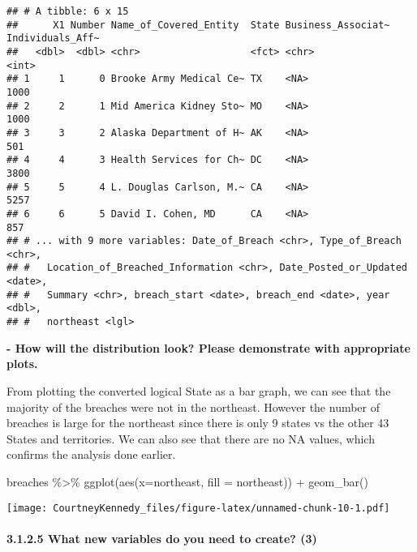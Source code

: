 \documentclass[
]{article}
\newenvironment{Shaded}{\begin{snugshade}}{\end{snugshade}}
\newcommand{\AttributeTok}[1]{\textcolor[rgb]{0.77,0.63,0.00}{#1}}
\newcommand{\FunctionTok}[1]{\textcolor[rgb]{0.00,0.00,0.00}{#1}}
\newcommand{\NormalTok}[1]{#1}
\newcommand{\SpecialCharTok}[1]{\textcolor[rgb]{0.00,0.00,0.00}{#1}}
\begin{document}
\begin{verbatim}
## # A tibble: 6 x 15
##      X1 Number Name_of_Covered_Entity  State Business_Associat~ Individuals_Aff~
##   <dbl>  <dbl> <chr>                   <fct> <chr>                         <int>
## 1     1      0 Brooke Army Medical Ce~ TX    <NA>                           1000
## 2     2      1 Mid America Kidney Sto~ MO    <NA>                           1000
## 3     3      2 Alaska Department of H~ AK    <NA>                            501
## 4     4      3 Health Services for Ch~ DC    <NA>                           3800
## 5     5      4 L. Douglas Carlson, M.~ CA    <NA>                           5257
## 6     6      5 David I. Cohen, MD      CA    <NA>                            857
## # ... with 9 more variables: Date_of_Breach <chr>, Type_of_Breach <chr>,
## #   Location_of_Breached_Information <chr>, Date_Posted_or_Updated <date>,
## #   Summary <chr>, breach_start <date>, breach_end <date>, year <dbl>,
## #   northeast <lgl>
\end{verbatim}

\textbf{- How will the distribution look? Please demonstrate with
appropriate plots.}

From plotting the converted logical State as a bar graph, we can see
that the majority of the breaches were not in the northeast. However the
number of breaches is large for the northeast since there is only 9
states vs the other 43 States and territories. We can also see that
there are no NA values, which confirms the analysis done earlier.

\begin{Shaded}
\begin{Highlighting}[]
\NormalTok{breaches }\SpecialCharTok{\%\textgreater{}\%}
  \FunctionTok{ggplot}\NormalTok{(}\FunctionTok{aes}\NormalTok{(}\AttributeTok{x=}\NormalTok{northeast, }\AttributeTok{fill =}\NormalTok{ northeast)) }\SpecialCharTok{+}
  \FunctionTok{geom\_bar}\NormalTok{()}
\end{Highlighting}
\end{Shaded}

\texttt{[image: CourtneyKennedy\_files/figure-latex/unnamed-chunk-10-1.pdf]}

\hypertarget{what-new-variables-do-you-need-to-create-3}{%
\paragraph{3.1.2.5 What new variables do you need to create?
(3)}\label{what-new-variables-do-you-need-to-create-3}}
\end{document}
